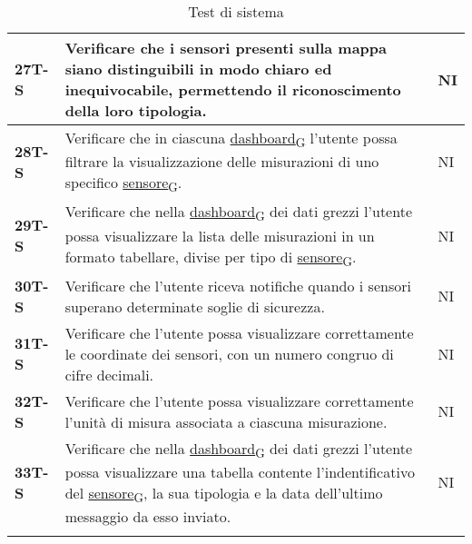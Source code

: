 \begin{longtable}{|>{\raggedright\arraybackslash}m{}|>{\raggedright\arraybackslash}m{}|>{\raggedright\arraybackslash}m{}|}
	\hline
	\textbf{27T-S}  & Verificare che i sensori presenti sulla mappa siano distinguibili in modo chiaro ed inequivocabile, permettendo il riconoscimento della loro tipologia.                                          & NI             \\
	\hline
	\textbf{28T-S}  & Verificare che in ciascuna \href{https://7last.github.io/docs/rtb/documentazione-interna/glossario\#dashboard}{dashboard\textsubscript{G}} l’utente possa filtrare la visualizzazione delle misurazioni di uno specifico \href{https://7last.github.io/docs/rtb/documentazione-interna/glossario\#sensore}{sensore\textsubscript{G}}.                                                                      & NI             \\
	\hline
	\textbf{29T-S}  & Verificare che nella \href{https://7last.github.io/docs/rtb/documentazione-interna/glossario\#dashboard}{dashboard\textsubscript{G}} dei dati grezzi l’utente possa visualizzare la lista delle misurazioni in un formato tabellare, divise per tipo di \href{https://7last.github.io/docs/rtb/documentazione-interna/glossario\#sensore}{sensore\textsubscript{G}}.                                       & NI             \\ %
	\hline
	\textbf{30T-S}  & Verificare che l’utente riceva notifiche quando i sensori superano determinate soglie di sicurezza.                                                                                          & NI             \\
	\hline
	\textbf{31T-S}  & Verificare che l’utente possa visualizzare correttamente le coordinate dei sensori, con un numero congruo di cifre decimali.                                                                     & NI             \\
	\hline
	\textbf{32T-S}  & Verificare che l’utente possa visualizzare correttamente l’unità di misura associata a ciascuna misurazione.                                                                                     & NI             \\
	\hline
	\textbf{33T-S}  & Verificare che nella \href{https://7last.github.io/docs/rtb/documentazione-interna/glossario\#dashboard}{dashboard\textsubscript{G}} dei dati grezzi l'utente possa visualizzare una tabella contente l'indentificativo del \href{https://7last.github.io/docs/rtb/documentazione-interna/glossario\#sensore}{sensore\textsubscript{G}}, la sua tipologia e la data dell'ultimo messaggio da esso inviato. & NI             \\
	\hline
	\caption{Test di sistema}
\end{longtable}

